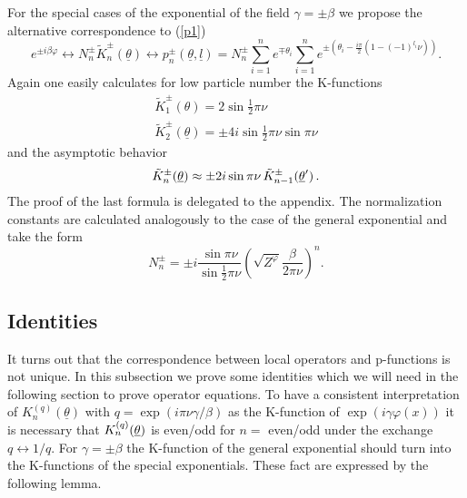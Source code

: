 \documentclass[a4paper,a4paper]{article}
\begin{document}
For the special cases of the exponential of the field $\gamma =\pm \beta $
we propose the alternative correspondence to (\ref{p1}) 
\begin{equation}
e^{\pm i\beta \varphi }\leftrightarrow N_{n}^{\pm }\tilde{K}_{n}^{\pm }(%
\underline{\theta })\leftrightarrow p_{n}^{\pm }(\underline{\theta },%
\underline{l})=N_{n}^{\pm }\sum\limits_{i=1}^{n}e^{\mp \theta
_{i}}\sum\limits_{i=1}^{n}e^{\pm \left( \theta _{i}-\frac{i\pi }{2}%
(1-(-1)^{l_{i}}\nu )\right) }.  \label{p5}
\end{equation}
Again one easily calculates for low particle number the K-functions 
\[
\begin{array}{l}
\tilde{K}_{1}^{\pm }(\theta )=2\sin \tfrac{1}{2}\pi \nu \\ 
\tilde{K}_{2}^{\pm }(\underline{\theta })=\pm 4i\sin \tfrac{1}{2}\pi \nu
\sin \pi \nu
\end{array}
\]
and the asymptotic behavior 
\[
\tilde{K}_{n}^{\pm }(\underline{\theta })\approx \pm 2i\sin \pi \nu \,\tilde{%
K}_{n-1}^{\pm }(\underline{\theta }^{\prime })\,. 
\]
The proof of the last formula is delegated to the appendix. The
normalization constants are calculated analogously to the case of the
general exponential and take the form 
\begin{equation}
N_{n}^{\pm }=\pm i\frac{\sin \pi \nu }{\sin \tfrac{1}{2}\pi \nu }\left( 
\sqrt{Z^{\varphi }}\frac{\beta }{2\pi \nu }\right) ^{n}.  \label{4.3}
\end{equation}

\subsection{Identities\label{s4.4}}

It turns out that the correspondence between local operators and p-functions
is not unique. In this subsection we prove some identities which we will
need in the following section to prove operator equations. To have a
consistent interpretation of $K_{n}^{(q)}(\underline{\theta })$ with $q=\exp
\left( i\pi \nu \gamma /\beta \right) $ as the K-function of $\exp \left(
i\gamma \varphi (x)\right) $ it is necessary that $K_{n}^{(q)}(\underline{%
\theta })$ is even/odd for $n=$ even/odd under the exchange $%
q\leftrightarrow 1/q$. For $\gamma =\pm \beta $ the K-function of the
general exponential should turn into the K-functions of the special
exponentials. These fact are expressed by the following lemma.
\end{document}
